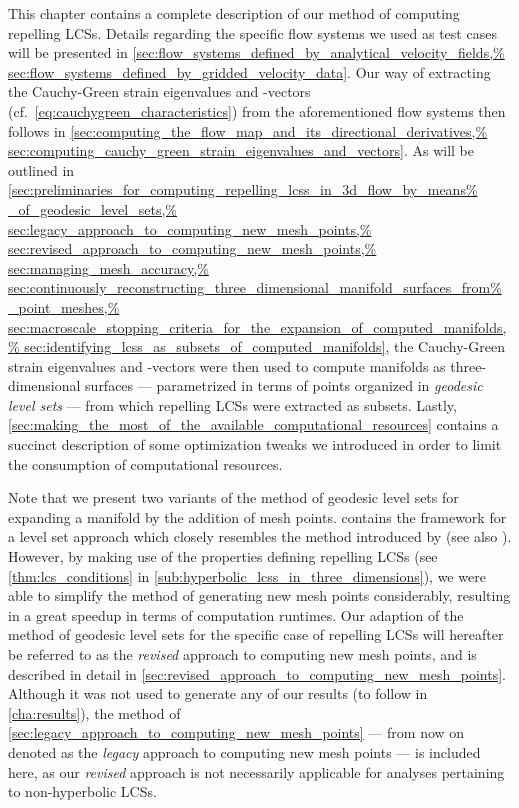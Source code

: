 This chapter contains a complete description of our method of computing
repelling LCSs. Details regarding the specific flow systems we used as test
cases will be presented in
\cref{sec:flow_systems_defined_by_analytical_velocity_fields,%
sec:flow_systems_defined_by_gridded_velocity_data}. Our way of extracting
the Cauchy-Green strain eigenvalues and -vectors (cf.\
\cref{eq:cauchygreen_characteristics}) from the aforementioned flow systems
then follows in
\cref{sec:computing_the_flow_map_and_its_directional_derivatives,%
sec:computing_cauchy_green_strain_eigenvalues_and_vectors}. As will be outlined
in \cref{sec:preliminaries_for_computing_repelling_lcss_in_3d_flow_by_means%
_of_geodesic_level_sets,%
sec:legacy_approach_to_computing_new_mesh_points,%
sec:revised_approach_to_computing_new_mesh_points,%
sec:managing_mesh_accuracy,%
sec:continuously_reconstructing_three_dimensional_manifold_surfaces_from%
_point_meshes,%
sec:macroscale_stopping_criteria_for_the_expansion_of_computed_manifolds,%
sec:identifying_lcss_as_subsets_of_computed_manifolds}, the Cauchy-Green
strain eigenvalues and -vectors were then used to compute manifolds as
three-dimensional surfaces --- parametrized in terms of points organized in
\emph{geodesic level sets} --- from which repelling LCSs were extracted as
subsets. Lastly,
\cref{sec:making_the_most_of_the_available_computational_resources} contains a
succinct description of some optimization tweaks we introduced in order to
limit the consumption of computational resources.

Note that we present two variants of the method of geodesic level sets for
expanding a manifold by the addition of mesh points.
 contains the framework
for a level set approach which closely resembles the method introduced by
\textcite{krauskopf2005survey} (see also \textcite{krauskopf2003computing}).
However, by making use of the properties defining repelling LCSs (see
\cref{thm:lcs_conditions} in \cref{sub:hyperbolic_lcss_in_three_dimensions}),
we were able to simplify the method of generating new mesh points considerably,
resulting in a great speedup in terms of computation runtimes. Our adaption of
the method of geodesic level sets for the specific case of repelling LCSs will
hereafter be referred to as the \emph{revised} approach to computing new mesh
points, and is described in detail in
\cref{sec:revised_approach_to_computing_new_mesh_points}. Although it was not
used to generate any of our results (to follow in \cref{cha:results}), the
method of \cref{sec:legacy_approach_to_computing_new_mesh_points} --- from now
on denoted as the \emph{legacy} approach to computing new mesh points --- is
included here, as our \emph{revised} approach is not necessarily applicable for
analyses pertaining to non-hyperbolic LCSs.


